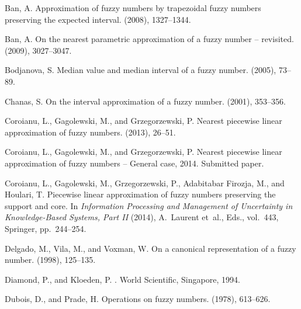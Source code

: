 \documentclass[11pt]{article}\usepackage[]{graphicx}\usepackage[]{color}
\begin{document}
\begin{thebibliography}{10}

{\sc Ban, A.}
\newblock Approximation of fuzzy numbers by trapezoidal fuzzy numbers
  preserving the expected interval.
 (2008), 1327--1344.

{\sc Ban, A.}
\newblock On the nearest parametric approximation of a fuzzy number --
  revisited.
 (2009), 3027--3047.

{\sc Bodjanova, S.}
\newblock Median value and median interval of a fuzzy number.
 (2005), 73--89.

{\sc Chanas, S.}
\newblock On the interval approximation of a fuzzy number.
 (2001), 353--356.

{\sc Coroianu, L., Gagolewski, M., and Grzegorzewski, P.}
\newblock Nearest piecewise linear approximation of fuzzy numbers.
 (2013), 26--51.

{\sc Coroianu, L., Gagolewski, M., and Grzegorzewski, P.}
\newblock Nearest piecewise linear approximation of fuzzy numbers -- {G}eneral
  case, 2014.
\newblock Submitted paper.

{\sc Coroianu, L., Gagolewski, M., Grzegorzewski, P., {Adabitabar Firozja}, M.,
  and Houlari, T.}
\newblock Piecewise linear approximation of fuzzy numbers preserving the
  support and core.
\newblock In {\em Information Processing and Management of Uncertainty in
  Knowledge-Based Systems, Part II\/} (2014), A.~Laurent et~al., Eds.,
  vol.~443, Springer, pp.~244--254.

{\sc Delgado, M., Vila, M., and Voxman, W.}
\newblock On a canonical representation of a fuzzy number.
 (1998), 125--135.

{\sc Diamond, P., and Kloeden, P.}
.
\newblock World Scientific, Singapore, 1994.

{\sc Dubois, D., and Prade, H.}
\newblock Operations on fuzzy numbers.
 (1978), 613--626.


\end{thebibliography}
\end{document}
